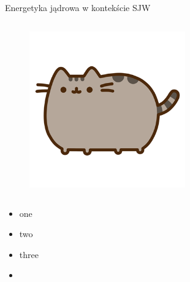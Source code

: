 \begin{columnframe}{Energetyka jądrowa w kontekście SJW}
    \begin{column}{0.5\textwidth}
        \begin{figure}
            \centering
            \includegraphics[width=0.6\textwidth, frame]{images/pusheen.png}
        \end{figure}
    \end{column}
    \begin{column}{0.5\textwidth}
        \begin{itemize}
            \item one \keV
            \item two \MeV
            \item three \GeV
            \item \aegis
        \end{itemize}
    \end{column}
\end{columnframe}

